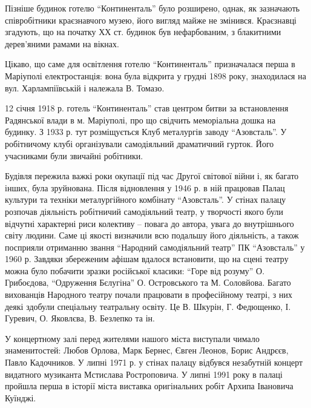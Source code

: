 
Пізніше будинок готелю \enquote{Континенталь} було розширено, однак, як зазначають
співробітники краєзнавчого музею, його вигляд майже не змінився. Краєзнавці
згадують, що на початку ХХ ст. будинок був нефарбованим, з блакитними
дерев'яними рамами на вікнах.

Цікаво, що саме для освітлення готелю \enquote{Континенталь} призначалася перша в
Маріуполі електростанція: вона була відкрита у грудні 1898 року, знаходилася на
вул. Харлампіївській і належала В. Томазо.

12 січня 1918 р. готель \enquote{Континенталь} став центром битви за встановлення
Радянської влади в м. Маріуполі, про що свідчить меморіальна дошка на будинку.
З 1933 р. тут розміщується Клуб металургів заводу \enquote{Азовсталь}. У робітничому
клубі організували самодіяльний драматичний гурток. Його учасниками були
звичайні робітники.

Будівля пережила важкі роки окупації під час Другої світової війни і, як багато
інших, була зруйнована. Після відновлення у 1946 р. в ній працював Палац
культури та техніки металургійного комбінату \enquote{Азовсталь}. У стінах
палацу розпочав діяльність робітничий самодіяльний театр, у творчості якого
були відчутні характерні риси колективу – повага до автора, увага до
внутрішнього світу людини. Саме ці якості визначили всю подальшу його
діяльність, а також посприяли отриманню звання \enquote{Народний самодіяльний
театр} ПК \enquote{Азовсталь} у 1960 р. Завдяки збереженим афішам вдалося
встановити, що на сцені театру можна було побачити зразки російської класики:
\enquote{Горе від розуму} О. Грибоєдова, \enquote{Одруження Бєлугіна} О.
Островського та М. Соловйова. Багато вихованців Народного театру почали
працювати в професійному театрі, з них деякі здобули спеціальну театральну
освіту. Це В. Шкурін, Г. Федющенко, І. Гуревич, О. Яковлєва, В.  Безлепко та
ін.

У концертному залі перед жителями нашого міста виступали чимало знаменитостей:
Любов Орлова, Марк Бернес, Євген Леонов, Борис Андрєєв, Павло Кадочников. У
липні 1971 р. у стінах палацу відбувся незабутній концерт видатного музиканта
Мстислава Ростроповича. У липні 1991 року в палаці пройшла перша в історії
міста виставка оригінальних робіт Архипа Івановича Куїнджі.


